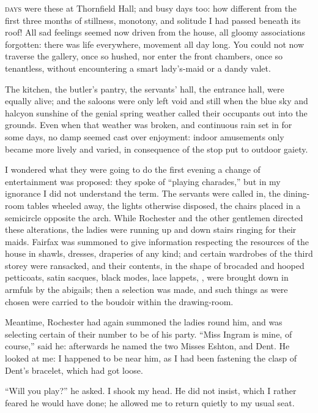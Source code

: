 
 \textsc{days} were these at Thornfield Hall; and busy days too: how
different from the first three months of stillness, monotony, and
solitude I had passed beneath its roof! All sad feelings seemed now
driven from the house, all gloomy associations forgotten: there was life
everywhere, movement all day long. You could not now traverse the
gallery, once so hushed, nor enter the front chambers, once so
tenantless, without encountering a smart lady's-maid or a dandy valet.

The kitchen, the butler's pantry, the servants' hall, the entrance hall,
were equally alive; and the saloons were only left void and still when
the blue sky and halcyon sunshine of the genial spring weather called
their occupants out into the grounds. Even when that weather was
broken, and continuous rain set in for some days, no damp seemed cast
over enjoyment: indoor amusements only became more lively and varied, in
consequence of the stop put to outdoor gaiety.

I wondered what they were going to do the first evening a change of
entertainment was proposed: they spoke of \enquote{playing charades,}
but in my ignorance I did not understand the term. The servants were
called in, the dining-room tables wheeled away, the lights otherwise
disposed, the chairs placed in a semicircle opposite the arch. While
\Mr{} Rochester and the other gentlemen directed these alterations, the
ladies were running up and down stairs ringing for their maids. \Mrs{}
Fairfax was summoned to give information respecting the resources of the
house in shawls, dresses, draperies of any kind; and certain wardrobes
of the third storey were ransacked, and their contents, in the shape of
brocaded and hooped petticoats, satin sacques, black modes, lace
lappets, \etc, were brought down in armfuls by the abigails; then a
selection was made, and such things as were chosen were carried to the
boudoir within the drawing-room.

Meantime, \Mr{} Rochester had again summoned the ladies round him, and was
selecting certain of their number to be of his party. \enquote{Miss
	Ingram is mine, of course,} said he: afterwards he named the two Misses
Eshton, and \Mrs{} Dent. He looked at me: I happened to be near him, as I
had been fastening the clasp of \Mrs{} Dent's bracelet, which had got
loose.

\enquote{Will you play?} he asked. I shook my head. He did not insist,
which I rather feared he would have done; he allowed me to return
quietly to my usual seat.

